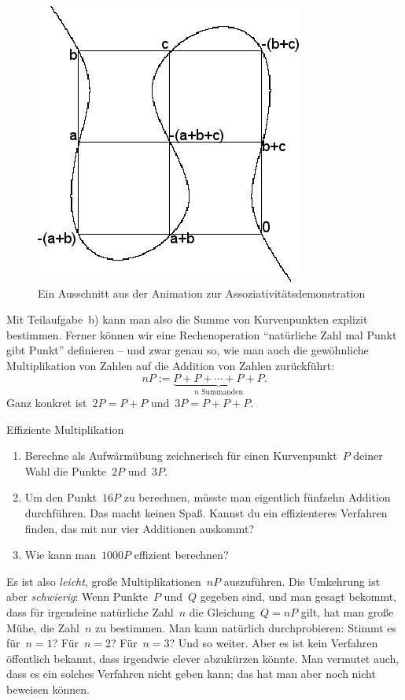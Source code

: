 \documentclass{zirkelblatt}
\begin{document}
\begin{figure}[t]
  \centering
  \includegraphics[scale=0.4]{elliptic-curve-associativity}
  \caption{Ein Ausschnitt aus der Animation zur Assoziativitätsdemonstration}
\end{figure}

Mit Teilaufgabe~b) kann man also die Summe von Kurvenpunkten explizit
bestimmen. Ferner können wir eine Rechenoperation "`natürliche Zahl mal Punkt
gibt Punkt"' definieren -- und zwar genau so, wie man auch die gewöhnliche
Multiplikation von Zahlen auf die Addition von Zahlen zurückführt:
\[ n P := \underbrace{P + P + \cdots + P + P}_{\text{$n$ Summanden}}. \]
Ganz konkret ist~$2 P = P + P$ und~$3 P = P + P + P$.

\begin{aufgabeShaded}{Effiziente Multiplikation}
\begin{enumerate}
\item Berechne als Aufwärmübung zeichnerisch für einen Kurvenpunkt~$P$ deiner Wahl die
Punkte~$2P$ und~$3P$.
\item Um den Punkt~$16P$ zu berechnen, müsste man eigentlich fünfzehn Addition
durchführen. Das macht keinen Spaß. Kannst du ein effizienteres Verfahren
finden, das mit nur vier Additionen auskommt?
\item Wie kann man~$1000P$ effizient berechnen?
\end{enumerate}
\end{aufgabeShaded}

Es ist also \emph{leicht}, große Multiplikationen~$nP$ auszuführen. Die
Umkehrung ist aber \emph{schwierig}: Wenn Punkte~$P$ und~$Q$ gegeben sind, und
man gesagt bekommt, dass für irgendeine natürliche Zahl~$n$ die Gleichung~$Q =
nP$ gilt, hat man große Mühe, die Zahl~$n$ zu bestimmen. Man kann natürlich
durchprobieren: Stimmt es für~$n = 1$? Für~$n = 2$? Für~$n = 3$? Und so weiter.
Aber es ist kein Verfahren öffentlich bekannt, dass irgendwie clever abzukürzen
könnte. Man vermutet auch, dass es ein solches Verfahren nicht geben kann; das
hat man aber noch nicht beweisen können.
\end{document}
